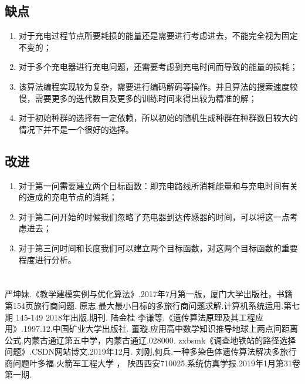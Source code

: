 \documentclass{article}
\renewcommand{\baselinestretch}{1.5}
\begin{document}
\subsection{缺点}
\begin{enumerate}[(1)] 
    \item 对于充电过程节点所要耗损的能量还是需要进行考虑进去，不能完全视为固定不变的；
    \item 对于多个充电器进行充电问题，还需要考虑到充电时间而导致的能量的损耗；
    \item 该算法编程实现较为复杂，需要进行编码解码等操作。并且算法的搜索速度较慢，需要更多的迭代数目及更多的训练时间来得出较为精准的解；
    \item 对于初始种群的选择有一定依赖，所以初始的随机生成种群在种群数目较大的情况下并不是一个很好的选择。
\end{enumerate}

\subsection{改进}
\begin{enumerate}[(1)] 
    \item 对于第一问需要建立两个目标函数：即充电路线所消耗能量和与充电时间有关的造成的充电节点的消耗；
    \item 对于第二问开始的时候我们忽略了充电器到达传感器的时间，可以将这一点考虑进去；
    \item 对于第三问时间和长度我们可以建立两个目标函数，对这两个目标函数的重要程度进行分析。
\end{enumerate}
\newpage
\section*{}
\renewcommand{\baselinestretch}{0.01}                       %
\begin{thebibliography}{99}                                 %
    严坤妹.《教学建模实例与优化算法》.2017年7月第一版，厦门大学出版社，书籍第154页旅行商问题.
    原志.最大最小目标的多旅行商问题求解.计算机系统运用.第七期 145-149 2018年出版.期刊.
    陆金桂\; 李谦等.《遗传算法原理及其工程应用》.1997.12.中国矿业大学出版社.
    董璇.应用高中数学知识推导地球上两点间距离公式.内蒙古通辽第五中学，内蒙古通辽.028000.
    zxbsmk《调查地铁站的路径选择问题》.CSDN网站博文.2019年12月.
    刘刚,何兵.一种多染色体遗传算法解决多旅行商问题叶多福.火箭军工程大学 ， 陕西西安710025.系统仿真学报.2019年1月第31卷第一期.
\end{thebibliography}
\thispagestyle{empty}
\newpage
   
\end{document}
